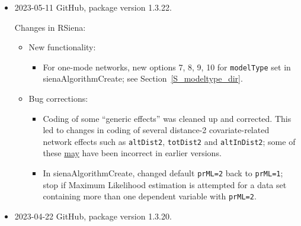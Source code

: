 \documentclass[a4paper,fleqn,11pt]{article}
\newcommand{\+}{\, + \,}
\newcommand{\sfn}[1]{\textsf{#1}}
\begin{document}
\begin{small}
\begin{itemize}
\item 2023-05-11 GitHub, package version 1.3.22.

Changes in RSiena:
\begin{itemize}
\item New functionality:
   \begin{itemize}
  \item For one-mode networks, new options 7, 8, 9, 10
     for \texttt{modelType} set in \sfn{sienaAlgorithmCreate};
     see Section~\ref{S_modeltype_dir}.
    \end{itemize}
\item  Bug corrections:
   \begin{itemize}
  \item Coding of some ``generic effects'' was cleaned up and corrected.
   This led to changes in coding of several distance-2 covariate-related network
	 effects such as \texttt{altDist2}, \texttt{totDist2} and \texttt{altInDist2};
   some of these \underline{may} have been incorrect in earlier versions.
  \item In \sfn{sienaAlgorithmCreate}, changed default \texttt{prML=2} back to \texttt{prML=1};
    stop if Maximum Likelihood estimation is attempted for a data set
    containing more than one dependent variable
    with \texttt{prML=2}.
    \end{itemize}
\end{itemize}

\item 2023-04-22 GitHub, package version 1.3.20.


\end{itemize}
\end{small}
\end{document}
